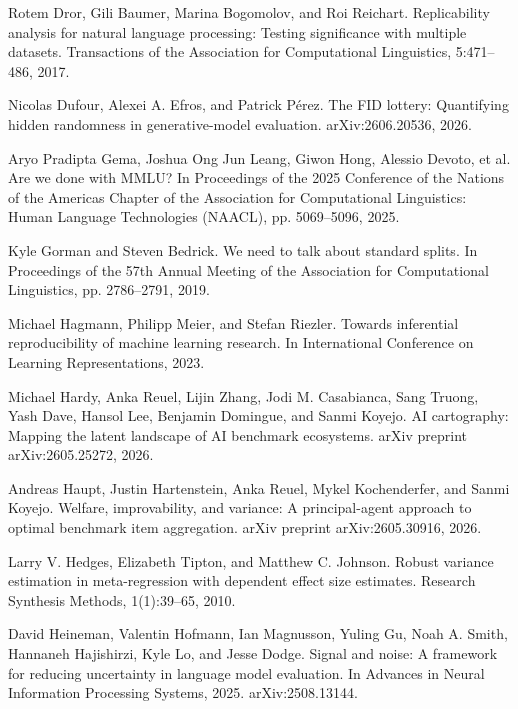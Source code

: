 \noindent Rotem Dror, Gili Baumer, Marina Bogomolov, and Roi Reichart. Replicability analysis for natural language processing: Testing significance with multiple datasets. Transactions of the Association for Computational Linguistics, 5:471--486, 2017.\par\medskip

\noindent Nicolas Dufour, Alexei A. Efros, and Patrick P\'{e}rez. The FID lottery: Quantifying hidden randomness in generative-model evaluation. arXiv:2606.20536, 2026.\par\medskip

\noindent Aryo Pradipta Gema, Joshua Ong Jun Leang, Giwon Hong, Alessio Devoto, et al. Are we done with MMLU? In Proceedings of the 2025 Conference of the Nations of the Americas Chapter of the Association for Computational Linguistics: Human Language Technologies (NAACL), pp. 5069--5096, 2025.\par\medskip

\noindent Kyle Gorman and Steven Bedrick. We need to talk about standard splits. In Proceedings of the 57th Annual Meeting of the Association for Computational Linguistics, pp. 2786--2791, 2019.\par\medskip

\noindent Michael Hagmann, Philipp Meier, and Stefan Riezler. Towards inferential reproducibility of machine learning research. In International Conference on Learning Representations, 2023.\par\medskip

\noindent Michael Hardy, Anka Reuel, Lijin Zhang, Jodi M. Casabianca, Sang Truong, Yash Dave, Hansol Lee, Benjamin Domingue, and Sanmi Koyejo. AI cartography: Mapping the latent landscape of AI benchmark ecosystems. arXiv preprint arXiv:2605.25272, 2026.\par\medskip

\noindent Andreas Haupt, Justin Hartenstein, Anka Reuel, Mykel Kochenderfer, and Sanmi Koyejo. Welfare, improvability, and variance: A principal-agent approach to optimal benchmark item aggregation. arXiv preprint arXiv:2605.30916, 2026.\par\medskip

\noindent Larry V. Hedges, Elizabeth Tipton, and Matthew C. Johnson. Robust variance estimation in meta-regression with dependent effect size estimates. Research Synthesis Methods, 1(1):39--65, 2010.\par\medskip

\noindent David Heineman, Valentin Hofmann, Ian Magnusson, Yuling Gu, Noah A. Smith, Hannaneh Hajishirzi, Kyle Lo, and Jesse Dodge. Signal and noise: A framework for reducing uncertainty in language model evaluation. In Advances in Neural Information Processing Systems, 2025. arXiv:2508.13144.\par\medskip

